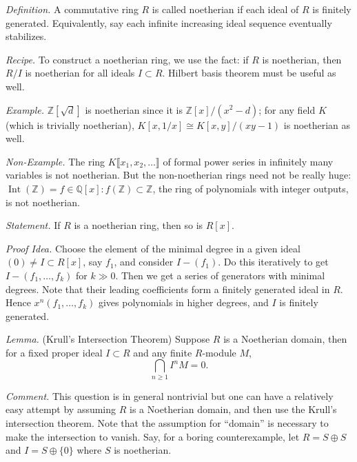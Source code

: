 \documentclass{mathproblems}
\newcommand\Q{\mathbb{Q}}
\newcommand\Z{\mathbb{Z}}
\begin{document}
\begin{questions}
\textit{Definition.} A commutative ring $R$ is called noetherian if each ideal of $R$ is finitely generated. Equivalently, say each infinite increasing ideal sequence eventually stabilizes.

{\color{violet}
\textit{Recipe.} To construct a noetherian ring, we use the fact: if $R$ is noetherian, then $R/I$ is noetherian for all ideals $I\subset R$. Hilbert basis theorem must be useful as well.}

\textit{Example.} $\Z[\sqrt{d}]$ is noetherian since it is $\Z[x]/(x^2-d)$; for any field $K$ (which is trivially noetherian), $K[x,1/x]\cong K[x,y]/(x y-1)$ is noetherian as well.

\textit{Non-Example.} The ring $K\llbracket x_1,x_2,\ldots\rrbracket$ of formal power series in infinitely many variables is not noetherian. But the non-noetherian rings need not be really huge: $\operatorname{Int}(\Z)={f\in \Q[x]: f(\Z)\subset \Z}$, the ring of polynomials with integer outputs, is not noetherian.


\textit{Statement.} If $R$ is a noetherian ring, then so is $R[x]$.

\textit{Proof Idea.} Choose the element of the minimal degree in a given ideal $(0)\neq I\subset R[x]$, say $f_1$, and consider $I-(f_1)$. Do this iteratively to get $I-(f_1,\ldots,f_k)$ for $k\gg 0$. Then we get a series of generators with minimal degrees. Note that their leading coefficients form a finitely generated ideal in $R$. Hence $x^n(f_1,\ldots,f_k)$ gives polynomials in higher degrees, and $I$ is finitely generated.


{\color{violet}
\textit{Lemma.} (Krull's Intersection Theorem) Suppose $R$ is a Noetherian domain, then for a fixed proper ideal $I\subset R$ and any finite $R$-module $M$, \vspace{-6pt}
$$
\bigcap_{n\geq 1} I^n M=0.
$$} \vspace{-16pt}

\textit{Comment.} This question is in general nontrivial but one can have a relatively easy attempt by assuming $R$ is a Noetherian domain, and then use the Krull's intersection theorem. Note that the assumption for ``domain'' is necessary to make the intersection to vanish. Say, for a boring counterexample, let $R=S\oplus S$ and $I=S\oplus \{0\}$ where $S$ is noetherian. 



\end{questions}
\end{document}

